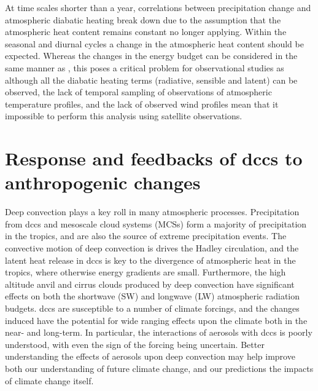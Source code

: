 At time scales shorter than a year, correlations between precipitation change and atmospheric diabatic heating break down \citep{nogueira_multi-scale_2019} due to the assumption that the atmospheric heat content remains constant no longer applying.
Within the seasonal and diurnal cycles a change in the atmospheric heat content should be expected.
Whereas the changes in the energy budget can be considered in the same manner as \citet{muller_energetic_2011}, this poses a critical problem for observational studies as although all the diabatic heating terms (radiative, sensible and latent) can be observed, the lack of temporal sampling of observations of atmospheric temperature profiles, and the lack of observed wind profiles mean that it impossible to perform this analysis using satellite observations.



\section{Response and feedbacks of \acrshort{dcc}s to anthropogenic changes}

Deep convection plays a key roll in many atmospheric processes.
Precipitation from \acrshort{dcc}s and mesoscale cloud systems (MCSs) form a majority of precipitation in the tropics, and are also the source of extreme precipitation events.
The convective motion of deep convection is drives the Hadley circulation, and the latent heat release in \acrshort{dcc}s is key to the divergence of atmospheric heat in the tropics, where otherwise energy gradients are small.
Furthermore, the high altitude anvil and cirrus clouds produced by deep convection have significant effects on both the shortwave (SW) and longwave (LW) atmospheric radiation budgets.
\acrshort{dcc}s are susceptible to a number of climate forcings, and the changes induced have the potential for wide ranging effects upon the climate both in the near- and long-term.
In particular, the interactions of aerosols with \acrshort{dcc}s is poorly understood, with even the sign of the forcing being uncertain. Better understanding the effects of aerosols upon deep convection may help improve both our understanding of future climate change, and our predictions the impacts of climate change itself.


